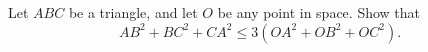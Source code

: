 Let $ABC$ be a triangle, and let $O$ be any point in space. Show that
\[ AB^2 + BC^2 + CA^2 \leq 3\left(OA^2 + OB^2 + OC^2\right). \]
